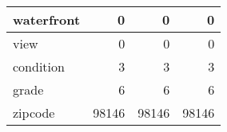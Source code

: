 \begin{table}[H]
\begin{tabular}{|l|r|r|r|}
\hline waterfront & \cellcolor[rgb]{0.9, 0.54, 0.52} 0 & \cellcolor[rgb]{0.9, 0.54, 0.52} 0 & \cellcolor[rgb]{0.9, 0.54, 0.52} 0 \\
\hline view & \cellcolor[rgb]{0.9, 0.54, 0.52} 0 & \cellcolor[rgb]{0.9, 0.54, 0.52} 0 & \cellcolor[rgb]{0.9, 0.54, 0.52} 0 \\
\hline condition & \cellcolor[rgb]{0.9, 0.54, 0.52} 3 & \cellcolor[rgb]{0.9, 0.54, 0.52} 3 & \cellcolor[rgb]{0.9, 0.54, 0.52} 3 \\
\hline grade & \cellcolor[rgb]{0.9, 0.54, 0.52} 6 & \cellcolor[rgb]{0.9, 0.54, 0.52} 6 & \cellcolor[rgb]{0.9, 0.54, 0.52} 6 \\
\hline zipcode & \cellcolor[rgb]{0.9, 0.54, 0.52} 98146 & \cellcolor[rgb]{0.9, 0.54, 0.52} 98146 & \cellcolor[rgb]{0.9, 0.54, 0.52} 98146 \\
\hline
\end{tabular}
\end{table}

